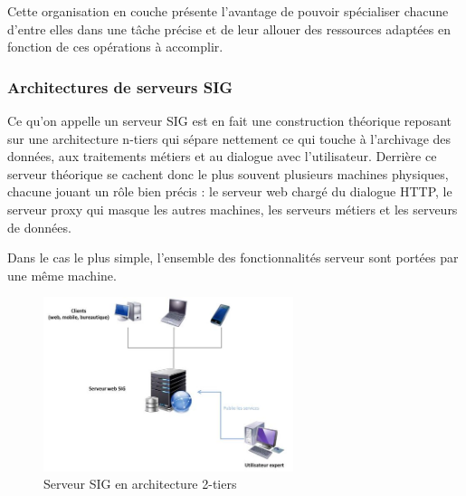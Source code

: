 \documentclass[11pt]{article}
\begin{document}
Cette organisation en couche présente l'avantage de pouvoir spécialiser chacune d'entre elles dans une tâche précise et de leur allouer des ressources adaptées en fonction de ces opérations à accomplir.

\begin{center}
\end{center}


\subsubsection{Architectures de serveurs SIG}
Ce qu’on appelle un serveur SIG est en fait une construction théorique reposant sur une architecture n-tiers qui sépare nettement ce qui touche à l’archivage des données, aux traitements métiers et au dialogue avec l’utilisateur. Derrière ce serveur théorique se cachent donc le plus souvent plusieurs machines physiques, chacune jouant un rôle bien précis : le serveur web chargé du dialogue HTTP, le serveur proxy qui masque les autres machines, les serveurs métiers et les serveurs de données.

Dans le cas le plus simple, l'ensemble des fonctionnalités serveur sont portées par une même machine.
\begin{figure}[H]
	\center \includegraphics[width=0.65\textwidth]{img/cours/archi_serveur_sig-1.jpg}
	\caption{Serveur SIG en architecture 2-tiers}
\end{figure}
\end{document}
